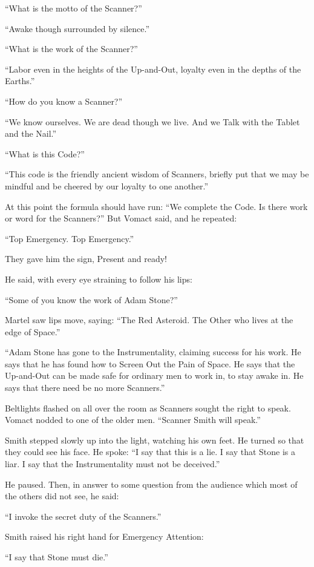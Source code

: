 ``What is the motto of the Scanner?''

``Awake though surrounded by silence.''

``What is the work of the Scanner?''

``Labor even in the heights of the Up-and-Out, loyalty even in the depths of the Earths.''

``How do you know a Scanner?''

``We know ourselves. We are dead though we live. And we Talk with the Tablet and the Nail.''

``What is this Code?''

``This code is the friendly ancient wisdom of Scanners, briefly put that we may be mindful and be cheered by our loyalty to one another.''

At this point the formula should have run: ``We complete the Code. Is there work or word for the Scanners?'' But Vomact said, and he repeated:

``Top Emergency. Top Emergency.''

They gave him the sign, Present and ready!

He said, with every eye straining to follow his lips:

``Some of you know the work of Adam Stone?''

Martel saw lips move, saying: ``The Red Asteroid. The Other who lives at the edge of Space.''

``Adam Stone has gone to the Instrumentality, claiming success for his work. He says that he has found how to Screen Out the Pain of Space. He says that the Up-and-Out can be made safe for ordinary men to work in, to stay awake in. He says that there need be no more Scanners.''

Beltlights flashed on all over the room as Scanners sought the right to speak. Vomact nodded to one of the older men. ``Scanner Smith will speak.''

Smith stepped slowly up into the light, watching his own feet. He turned so that they could see his face. He spoke: ``I say that this is a lie. I say that Stone is a liar. I say that the Instrumentality must not be deceived.''

He paused. Then, in answer to some question from the audience which most of the others did not see, he said:

``I invoke the secret duty of the Scanners.''

Smith raised his right hand for Emergency Attention:

``I say that Stone must die.''

